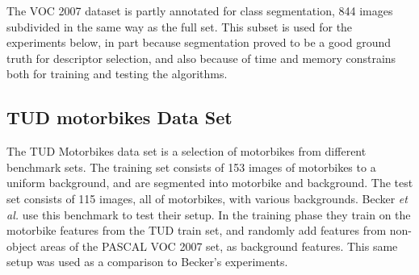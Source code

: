 The VOC 2007 dataset is partly annotated for class segmentation, 844 images subdivided in the same way as the full set. This subset is used for the experiments below, in part because segmentation proved to be a good ground truth for descriptor selection, and also because of time and memory constrains both for training and testing the algorithms.


\subsection{TUD motorbikes Data Set} %
\label{sec:tudmotorbikes_data_set}
The TUD Motorbikes data set is a selection of motorbikes from different benchmark sets. \cite{fritz2005integrating} The training set consists of 153 images of motorbikes to a uniform background, and are segmented into motorbike and background. The test set consists of 115 images, all of motorbikes, with various backgrounds. Becker \emph{et al.} \cite{becker2012codebook} use this benchmark to test their setup. In the training phase they train on the motorbike features from the TUD train set, and randomly add features from non-object areas of the PASCAL VOC 2007 set, as background features. This same setup was used as a comparison to Becker's experiments.


% 

% 

